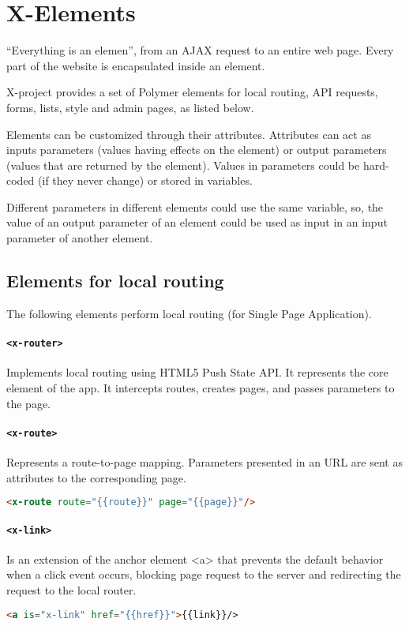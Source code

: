 \section{X-Elements}
\label{sec:XPR_xel}

``Everything is an elemen'', from an AJAX request to an entire web page. Every part of the website is encapsulated inside an element.

X-project provides a set of Polymer elements for local routing, API requests, forms, lists, style and admin pages, as listed below.

Elements can be customized through their attributes. Attributes can act as inputs parameters (values having effects on the element) or output parameters (values that are returned by the element). Values in parameters could be hard-coded (if they never change) or stored in variables.

Different parameters in different elements could use the same variable, so, the value of an output parameter of an element could be used as input in an input parameter of another element.

\subsection{Elements for local routing}

The following elements perform local routing (for Single Page Application).
\paragraph{\texttt{<x-router>}} Implements local routing using HTML5 Push State API. It represents the core element of the app. It intercepts routes, creates pages, and passes parameters to the page.
\paragraph{\texttt{<x-route>}} Represents a route-to-page mapping. Parameters presented in an URL are sent as attributes to the corresponding page.
\begin{lstlisting}[language=html]
<x-route route="{{route}}" page="{{page}}"/>
\end{lstlisting}
\paragraph{\texttt{<x-link>}} Is an extension of the anchor element <a> that prevents the default behavior when a click event occurs, blocking page request to the server and redirecting the request to the local router.
\begin{lstlisting}[language=html]
<a is="x-link" href="{{href}}">{{link}}/>
\end{lstlisting}

